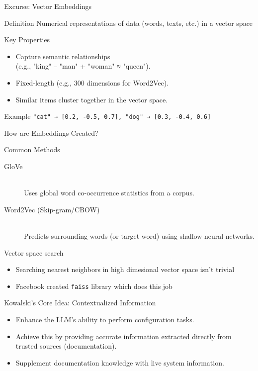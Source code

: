 \documentclass[aspectratio=169]{beamer}
\begin{document}
\begin{frame}{Excurse: Vector Embeddings}
  \begin{block}{Definition}
  Numerical representations of data (words, texts, etc.) in a vector space
  \end{block}
  \begin{block}{Key Properties}
  \begin{itemize}
    \item Capture semantic relationships \\(e.g., "king" – "man" + "woman" ≈ "queen").
    \item Fixed-length (e.g., 300 dimensions for Word2Vec).
    \item Similar items cluster together in the vector space.
  \end{itemize}
  \end{block}
  \begin{block}{Example}
  \texttt{"cat" → [0.2, -0.5, 0.7], "dog" → [0.3, -0.4, 0.6]}
  \end{block}
\end{frame}

\begin{frame}{How are Embeddings Created?}
  \begin{block}{Common Methods}
  \begin{description}
    \item[GloVe]\hfill \\ Uses global word co-occurrence statistics from a corpus.
    \item[Word2Vec (Skip-gram/CBOW)]\hfill \\Predicts surrounding words (or target word) using shallow neural networks.
  \end{description}
  \end{block}
  \begin{block}{Vector space search}
  \begin{itemize}
    \item Searching nearest neighbors in high dimesional vector space isn't  trivial
    \item Facebook created \texttt{faiss} library which does this job
  \end{itemize}
  \end{block}
\end{frame}

\begin{frame}{Kowalski's Core Idea: Contextualized Information}
  \begin{itemize}
    \item Enhance the LLM's ability to perform configuration tasks.
    \item Achieve this by providing accurate information extracted directly from trusted sources (documentation).
    \item Supplement documentation knowledge with live system information.
  \end{itemize}
\end{frame}
\end{document}
